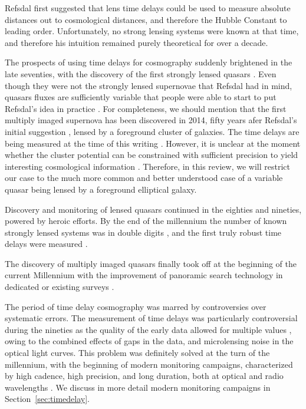 Refsdal \cite{Ref64} first suggested that lens time delays could be
used to measure absolute distances out to cosmological distances, and
therefore the Hubble Constant to leading order. Unfortunately, no
strong lensing systems were known at that time, and therefore his
intuition remained purely theoretical for over a decade. 

The prospects of using time delays for cosmography suddenly brightened
in the late seventies, with the discovery of the first strongly lensed
quasars \cite{WCW79}. Even though they were not the strongly lensed
supernovae that Refsdal had in mind, quasars fluxes are sufficiently
variable \cite{Van82} that people were able to start to put Refsdal's
idea in practice \cite{Van89}. For completeness, we should mention
that the first multiply imaged supernova has been discovered in 2014,
fifty years afer Refsdal's initial suggestion \cite{Kel++15}, lensed
by a foreground cluster of galaxies. The time delays are being
measured at the time of this writing
\cite{Rod++16,Kel++16}. However, it is unclear at the moment whether the 
cluster potential can be constrained with sufficient precision to
yield interesting cosmological information \cite{Tre++16}. Therefore,
in this review, we will restrict our case to the much more common and
better understood case of a variable quasar being lensed by a
foreground elliptical galaxy.

Discovery and monitoring of lensed quasars continued in the eighties
and nineties, powered by heroic efforts. By the end of the millennium
the number of known strongly lensed systems was in double digits
\cite{CSS02}, and the first truly robust time delays were measured
\cite{Kun++97,Sch++97}. 

The discovery of multiply imaged quasars finally took off at the
beginning of the current Millennium with the improvement of panoramic
search technology in dedicated or existing surveys
\cite{Bro++03,Oguri:2006p5865,Agn++15}.

The period of time delay cosmography was marred by controversies over
systematic errors.  The measurement of time delays was particularly
controversial during the nineties as the quality of the early data
allowed for multiple values \cite{PRH92}, owing to the combined
effects of gaps in the data, and microlensing noise in the optical
light curves. This problem was definitely solved at the turn of the
millennium, with the beginning of modern monitoring campaigns,
characterized by high cadence, high precision, and long duration, both
at optical and radio wavelengths
\cite{Fas++99,Fas++02,Bur++02,Eig++05}. We discuss in more detail 
modern monitoring campaigns in Section~\ref{sec:timedelay}.

